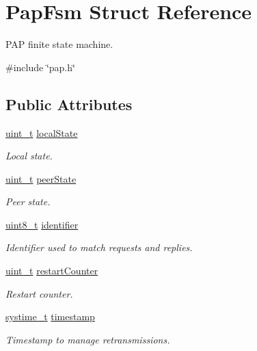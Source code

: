 \hypertarget{structPapFsm}{}\section{Pap\+Fsm Struct Reference}
\label{structPapFsm}


P\+AP finite state machine.  




{\ttfamily \#include \char`\"{}pap.\+h\char`\"{}}

\subsection*{Public Attributes}
\begin{DoxyCompactItemize}
\item 
\hyperlink{compiler__port_8h_a12a1e9b3ce141648783a82445d02b58d}{uint\+\_\+t} \hyperlink{structPapFsm_ae6b6b1e5a24606eda4669a0560174808}{local\+State}
\begin{DoxyCompactList}\small\item\em Local state. \end{DoxyCompactList}\item 
\hyperlink{compiler__port_8h_a12a1e9b3ce141648783a82445d02b58d}{uint\+\_\+t} \hyperlink{structPapFsm_a325cd51c0faa4171af5355dee5637e46}{peer\+State}
\begin{DoxyCompactList}\small\item\em Peer state. \end{DoxyCompactList}\item 
\hyperlink{stdint_8h_aba7bc1797add20fe3efdf37ced1182c5}{uint8\+\_\+t} \hyperlink{structPapFsm_af47e60588f579ffc9bb220a18af10340}{identifier}
\begin{DoxyCompactList}\small\item\em Identifier used to match requests and replies. \end{DoxyCompactList}\item 
\hyperlink{compiler__port_8h_a12a1e9b3ce141648783a82445d02b58d}{uint\+\_\+t} \hyperlink{structPapFsm_acfd494e70fec3eae6978eb5bc0c7cb57}{restart\+Counter}
\begin{DoxyCompactList}\small\item\em Restart counter. \end{DoxyCompactList}\item 
\hyperlink{compiler__port_8h_ae3e32a98d431a02106616da3071832dd}{systime\+\_\+t} \hyperlink{structPapFsm_ada695494f0dd007ced59fe10189ec4c2}{timestamp}
\begin{DoxyCompactList}\small\item\em Timestamp to manage retransmissions. \end{DoxyCompactList}\item 

\end{DoxyCompactItemize}

